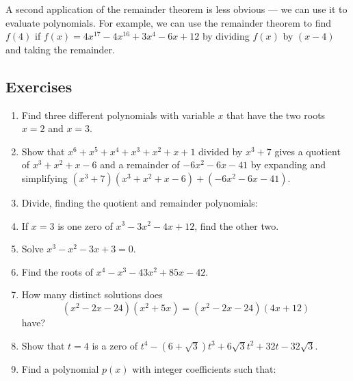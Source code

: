 \documentclass[a4paper,10pt,titlepage]{article}
\theoremstyle{definition}
\begin{document}
A second application of the remainder theorem is less obvious --- we can
use it to evaluate polynomials. For example, we can use the remainder theorem
to find $ f(4) $ if $ f(x) = 4x^{17} - 4x^{16} + 3x^4 - 6x + 12 $ by dividing $ f(x) $
by $ (x - 4) $ and taking the remainder.

\subsection*{Exercises}
\begin{enumerate}
  \item Find three different polynomials with variable $ x $ that have the two roots $ x = 2 $ and $ x = 3 $.
  \item Show that $ x^6 + x^5 + x^4 + x^3 + x^2 + x + 1 $ divided by $ x^3 + 7 $ gives
        a quotient of $ x^3 + x^2 + x - 6 $ and a remainder of $ -6x^2 - 6x - 41 $ by
        expanding and simplifying $ (x^3 + 7)(x^3 + x^2 + x - 6) + (-6x^2 - 6x - 41) $.
  \item Divide, finding the quotient and remainder polynomials:
  \item If $ x = 3 $ is one zero of $ x^3 - 3x^2 - 4x + 12 $, find the other two.
  \item Solve $ x^3 - x^2 - 3x + 3 = 0 $.
  \item Find the roots of $ x^4 - x^3 - 43x^2 + 85x - 42 $.
  \item How many distinct solutions does
        \begin{displaymath}
          (x^2 - 2x - 24)(x^2 + 5x) = (x^2 - 2x - 24)(4x + 12)
        \end{displaymath}
        have?
  \item Show that $ t = 4 $ is a zero of $ t^4 - (6 + \sqrt{3})t^3 + 6\sqrt{3}t^2 + 32t -32\sqrt{3} $.
  \item Find a polynomial $ p(x) $ with integer coefficients such that:
\end{enumerate}
\end{document}
